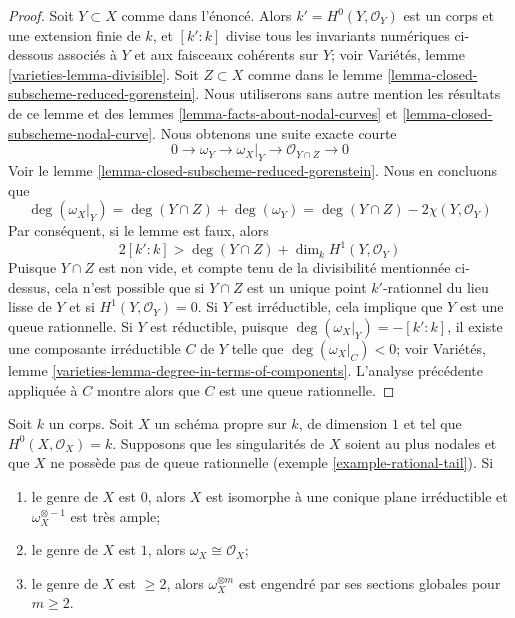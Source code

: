 \begin{proof}
Soit $Y \subset X$ comme dans l'énoncé. Alors $k' = H^0(Y, \mathcal{O}_Y)$ est un corps et une extension finie de $k$, et $[k' : k]$ divise tous les invariants numériques ci-dessous associés à $Y$ et aux faisceaux cohérents sur $Y$; voir Variétés, lemme \ref{varieties-lemma-divisible}. Soit $Z \subset X$ comme dans le lemme \ref{lemma-closed-subscheme-reduced-gorenstein}. Nous utiliserons sans autre mention les résultats de ce lemme et des lemmes \ref{lemma-facts-about-nodal-curves} et \ref{lemma-closed-subscheme-nodal-curve}. Nous obtenons une suite exacte courte $$
0 \to \omega_Y \to \omega_X|_Y \to \mathcal{O}_{Y \cap Z} \to 0
$$ Voir le lemme \ref{lemma-closed-subscheme-reduced-gorenstein}. Nous en concluons que $$
\deg(\omega_X|_Y) = \deg(Y \cap Z) + \deg(\omega_Y) =
\deg(Y \cap Z) - 2\chi(Y, \mathcal{O}_Y)
$$ Par conséquent, si le lemme est faux, alors $$
2[k' : k] > \deg(Y \cap Z) + \dim_k H^1(Y, \mathcal{O}_Y)
$$ Puisque $Y \cap Z$ est non vide, et compte tenu de la divisibilité mentionnée ci-dessus, cela n'est possible que si $Y \cap Z$ est un unique point $k'$-rationnel du lieu lisse de $Y$ et si $H^1(Y, \mathcal{O}_Y) = 0$. Si $Y$ est irréductible, cela implique que $Y$ est une queue rationnelle. Si $Y$ est réductible, puisque $\deg(\omega_X|_Y) = -[k' : k]$, il existe une composante irréductible $C$ de $Y$ telle que $\deg(\omega_X|_C) < 0$; voir Variétés, lemme \ref{varieties-lemma-degree-in-terms-of-components}. L'analyse précédente appliquée à $C$ montre alors que $C$ est une queue rationnelle.
\end{proof}

\begin{lemma}
\label{lemma-no-rational-tail-semiample-genus-geq-2}
Soit $k$ un corps. Soit $X$ un schéma propre sur $k$, de dimension $1$ et tel que $H^0(X, \mathcal{O}_X) = k$. Supposons que les singularités de $X$ soient au plus nodales et que $X$ ne possède pas de queue rationnelle (exemple \ref{example-rational-tail}). Si \begin{enumerate} \item le genre de $X$ est $0$, alors $X$ est isomorphe à une conique plane irréductible et $\omega_X^{\otimes -1}$ est très ample; \item le genre de $X$ est $1$, alors $\omega_X \cong \mathcal{O}_X$; \item le genre de $X$ est $\geq 2$, alors $\omega_X^{\otimes m}$ est engendré par ses sections globales pour $m \geq 2$.
\end{enumerate}
\end{lemma}

